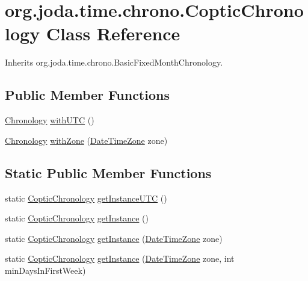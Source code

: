 \hypertarget{classorg_1_1joda_1_1time_1_1chrono_1_1_coptic_chronology}{\section{org.\-joda.\-time.\-chrono.\-Coptic\-Chronology Class Reference}
\label{classorg_1_1joda_1_1time_1_1chrono_1_1_coptic_chronology}
}


Inherits org.\-joda.\-time.\-chrono.\-Basic\-Fixed\-Month\-Chronology.

\subsection*{Public Member Functions}
\begin{DoxyCompactItemize}
\item 
\hyperlink{classorg_1_1joda_1_1time_1_1_chronology}{Chronology} \hyperlink{classorg_1_1joda_1_1time_1_1chrono_1_1_coptic_chronology_a7b23ee9b458cd5a20c801eb48f7d8b1e}{with\-U\-T\-C} ()
\item 
\hyperlink{classorg_1_1joda_1_1time_1_1_chronology}{Chronology} \hyperlink{classorg_1_1joda_1_1time_1_1chrono_1_1_coptic_chronology_a9ec2df548a651ae84941d4b2657f357b}{with\-Zone} (\hyperlink{classorg_1_1joda_1_1time_1_1_date_time_zone}{Date\-Time\-Zone} zone)
\end{DoxyCompactItemize}
\subsection*{Static Public Member Functions}
\begin{DoxyCompactItemize}
\item 
static \hyperlink{classorg_1_1joda_1_1time_1_1chrono_1_1_coptic_chronology}{Coptic\-Chronology} \hyperlink{classorg_1_1joda_1_1time_1_1chrono_1_1_coptic_chronology_afc16687d2291c24b98fd00a1332b3a58}{get\-Instance\-U\-T\-C} ()
\item 
static \hyperlink{classorg_1_1joda_1_1time_1_1chrono_1_1_coptic_chronology}{Coptic\-Chronology} \hyperlink{classorg_1_1joda_1_1time_1_1chrono_1_1_coptic_chronology_a6818667ec3917883f817154fd5f114d9}{get\-Instance} ()
\item 
static \hyperlink{classorg_1_1joda_1_1time_1_1chrono_1_1_coptic_chronology}{Coptic\-Chronology} \hyperlink{classorg_1_1joda_1_1time_1_1chrono_1_1_coptic_chronology_a906f2f1deb93f925325415c8f567c49d}{get\-Instance} (\hyperlink{classorg_1_1joda_1_1time_1_1_date_time_zone}{Date\-Time\-Zone} zone)
\item 
static \hyperlink{classorg_1_1joda_1_1time_1_1chrono_1_1_coptic_chronology}{Coptic\-Chronology} \hyperlink{classorg_1_1joda_1_1time_1_1chrono_1_1_coptic_chronology_aea934dc3a1eedb3d6105129f4c514949}{get\-Instance} (\hyperlink{classorg_1_1joda_1_1time_1_1_date_time_zone}{Date\-Time\-Zone} zone, int min\-Days\-In\-First\-Week)
\end{DoxyCompactItemize}
